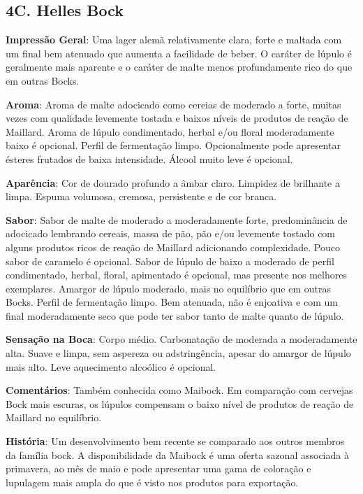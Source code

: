 \subsection*{4C. Helles Bock}
\textbf{Impressão Geral}: Uma lager alemã relativamente clara, forte e maltada com um final bem atenuado que aumenta a facilidade de beber. O caráter de lúpulo é geralmente mais aparente e o caráter de malte menos profundamente rico do que em outras Bocks.

\textbf{Aroma}: Aroma de malte adocicado como cereias de moderado a forte, muitas vezes com qualidade levemente tostada e baixos níveis de produtos de reação de Maillard. Aroma de lúpulo condimentado, herbal e/ou floral moderadamente baixo é opcional. Perfil de fermentação limpo. Opcionalmente pode apresentar ésteres frutados de baixa intensidade. Álcool muito leve é opcional.

\textbf{Aparência}: Cor de dourado profundo a âmbar claro. Limpidez de brilhante a limpa. Espuma volumosa, cremosa, persistente e de cor branca.

\textbf{Sabor}: Sabor de malte de moderado a moderadamente forte, predominância de adocicado lembrando cereais, massa de pão, pão e/ou levemente tostado com alguns produtos ricos de reação de Maillard adicionando complexidade. Pouco sabor de caramelo é opcional. Sabor de lúpulo de baixo a moderado de perfil condimentado, herbal, floral, apimentado é opcional, mas presente nos melhores exemplares. Amargor de lúpulo moderado, mais no equilíbrio que em outras Bocks. Perfil de fermentação limpo. Bem atenuada, não é enjoativa e com um final moderadamente seco que pode ter sabor tanto de malte quanto de lúpulo.

\textbf{Sensação na Boca}: Corpo médio. Carbonatação de moderada a moderadamente alta. Suave e limpa, sem aspereza ou adstringência, apesar do amargor de lúpulo mais alto. Leve aquecimento alcoólico é opcional.

\textbf{Comentários}: Também conhecida como Maibock. Em comparação com cervejas Bock mais escuras, os lúpulos compensam o baixo nível de produtos de reação de Maillard no equilíbrio.

\textbf{História}: Um desenvolvimento bem recente se comparado aos outros membros da família bock. A disponibilidade da Maibock é uma oferta sazonal associada à primavera, ao mês de maio e pode apresentar uma gama de coloração e lupulagem mais ampla do que é visto nos produtos para exportação.

